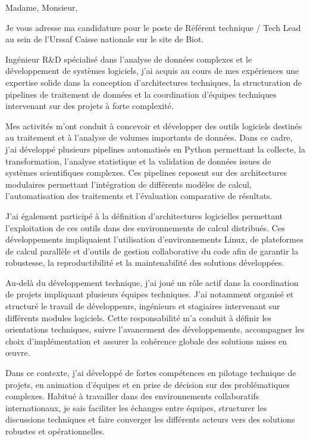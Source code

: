 \documentclass[11pt,a4paper]{../_shared/altacv}
\begin{document}
{\color{body}

Madame, Monsieur,

Je vous adresse ma candidature pour le poste de Référent technique / Tech Lead au sein de l’Urssaf Caisse nationale sur le site de Biot.

Ingénieur R\&D spécialisé dans l’analyse de données complexes et le développement de systèmes logiciels, j’ai acquis au cours de mes expériences une expertise solide dans la conception d’architectures techniques, la structuration de pipelines de traitement de données et la coordination d’équipes techniques intervenant sur des projets à forte complexité.

Mes activités m’ont conduit à concevoir et développer des outils logiciels destinés au traitement et à l’analyse de volumes importants de données. Dans ce cadre, j’ai développé plusieurs pipelines automatisés en Python permettant la collecte, la transformation, l’analyse statistique et la validation de données issues de systèmes scientifiques complexes. Ces pipelines reposent sur des architectures modulaires permettant l’intégration de différents modèles de calcul, l’automatisation des traitements et l’évaluation comparative de résultats.

J’ai également participé à la définition d’architectures logicielles permettant l’exploitation de ces outils dans des environnements de calcul distribués. Ces développements impliquaient l’utilisation d’environnements Linux, de plateformes de calcul parallèle et d’outils de gestion collaborative du code afin de garantir la robustesse, la reproductibilité et la maintenabilité des solutions développées.

Au-delà du développement technique, j’ai joué un rôle actif dans la coordination de projets impliquant plusieurs équipes techniques. J’ai notamment organisé et structuré le travail de développeurs, ingénieurs et stagiaires intervenant sur différents modules logiciels. Cette responsabilité m’a conduit à définir les orientations techniques, suivre l’avancement des développements, accompagner les choix d’implémentation et assurer la cohérence globale des solutions mises en œuvre.

Dans ce contexte, j’ai développé de fortes compétences en pilotage technique de projets, en animation d’équipes et en prise de décision sur des problématiques complexes. Habitué à travailler dans des environnements collaboratifs internationaux, je sais faciliter les échanges entre équipes, structurer les discussions techniques et faire converger les différents acteurs vers des solutions robustes et opérationnelles.

}
\end{document}

